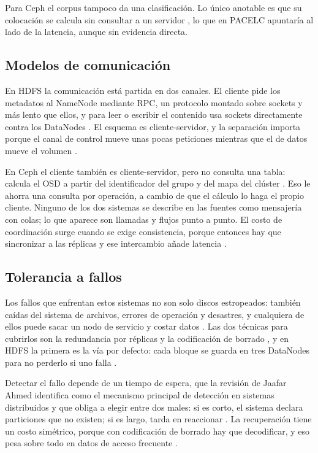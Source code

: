 \documentclass[12pt,a4paper]{article}
\begin{document}
Para Ceph el corpus tampoco da una clasificación. Lo único anotable es que su colocación se calcula sin consultar a un servidor \cite[p.~1128]{li2023ceph}, lo que en PACELC apuntaría al lado de la latencia, aunque sin evidencia directa.

\subsection{Modelos de comunicación}

En HDFS la comunicación está partida en dos canales. El cliente pide los metadatos al NameNode mediante RPC, un protocolo montado sobre sockets y más lento que ellos, y para leer o escribir el contenido usa sockets directamente contra los DataNodes \cite[p.~11]{tchaye2019hpf}. El esquema es cliente-servidor, y la separación importa porque el canal de control mueve unas pocas peticiones mientras que el de datos mueve el volumen \cite[p.~4]{kim2021erasure}.

En Ceph el cliente también es cliente-servidor, pero no consulta una tabla: calcula el OSD a partir del identificador del grupo y del mapa del clúster \cite[p.~1128]{li2023ceph}. Eso le ahorra una consulta por operación, a cambio de que el cálculo lo haga el propio cliente. Ninguno de los dos sistemas se describe en las fuentes como mensajería con colas; lo que aparece son llamadas y flujos punto a punto. El costo de coordinación surge cuando se exige consistencia, porque entonces hay que sincronizar a las réplicas y ese intercambio añade latencia \cite[p.~1]{ahmed2023consistency}.

\subsection{Tolerancia a fallos}

Los fallos que enfrentan estos sistemas no son solo discos estropeados: también caídas del sistema de archivos, errores de operación y desastres, y cualquiera de ellos puede sacar un nodo de servicio y costar datos \cite[p.~1]{lei2024fpga}. Las dos técnicas para cubrirlos son la redundancia por réplicas y la codificación de borrado \cite[p.~1]{lei2024fpga}, y en HDFS la primera es la vía por defecto: cada bloque se guarda en tres DataNodes para no perderlo si uno falla \cite[p.~1]{tchaye2019hpf}.

Detectar el fallo depende de un tiempo de espera, que la revisión de Jaafar Ahmed identifica como el mecanismo principal de detección en sistemas distribuidos y que obliga a elegir entre dos males: si es corto, el sistema declara particiones que no existen; si es largo, tarda en reaccionar \cite[p.~172]{ahmed2023consistency}. La recuperación tiene un costo simétrico, porque con codificación de borrado hay que decodificar, y eso pesa sobre todo en datos de acceso frecuente \cite[p.~1]{lei2024recovery}.
\end{document}
